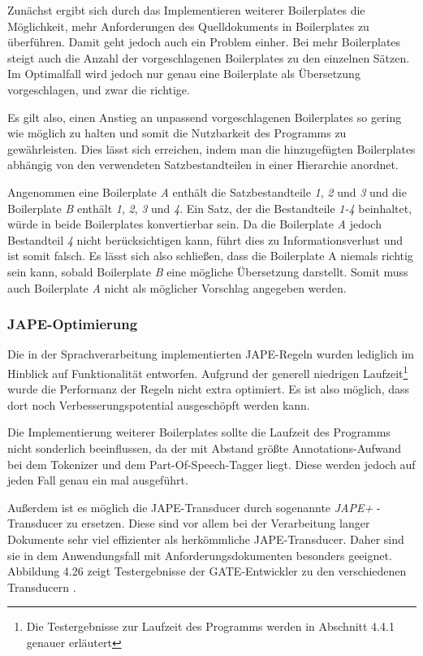 \documentclass[12pt]{report}
\begin{document}
Zunächst ergibt sich durch das Implementieren weiterer Boilerplates die Möglichkeit, mehr Anforderungen des Quelldokuments in Boilerplates zu überführen. Damit geht jedoch auch ein Problem einher. Bei mehr Boilerplates steigt auch die Anzahl der vorgeschlagenen Boilerplates zu den einzelnen Sätzen. Im Optimalfall wird jedoch nur genau eine Boilerplate als Übersetzung vorgeschlagen, und zwar die richtige. 

Es gilt also, einen Anstieg an unpassend vorgeschlagenen Boilerplates so gering wie möglich zu halten und somit die Nutzbarkeit des Programms zu gewährleisten. Dies lässt sich erreichen, indem man die hinzugefügten Boilerplates abhängig von den verwendeten Satzbestandteilen in einer Hierarchie anordnet. 

Angenommen eine Boilerplate \textit{A} enthält die Satzbestandteile \textit{1}, \textit{2} und \textit{3} und die Boilerplate \textit{B} enthält \textit{1}, \textit{2}, \textit{3} und \textit{4}. Ein Satz, der die Bestandteile \textit{1-4} beinhaltet, würde in beide Boilerplates konvertierbar sein. Da die Boilerplate \textit{A} jedoch Bestandteil \textit{4} nicht berücksichtigen kann, führt dies zu Informationsverlust und ist somit falsch. Es lässt sich also schließen, dass die Boilerplate A niemals richtig sein kann, sobald Boilerplate \textit{B} eine  mögliche Übersetzung darstellt. Somit muss auch Boilerplate \textit{A} nicht als möglicher Vorschlag angegeben werden.
 
\subsubsection{JAPE-Optimierung}
Die in der Sprachverarbeitung implementierten JAPE-Regeln wurden lediglich im Hinblick auf Funktionalität entworfen. Aufgrund der generell niedrigen Laufzeit\footnote{Die Testergebnisse zur Laufzeit des Programms werden in Abschnitt 4.4.1 genauer erläutert} wurde die Performanz der Regeln nicht extra optimiert. Es ist also möglich, dass dort noch Verbesserungspotential ausgeschöpft werden kann. 

Die Implementierung weiterer Boilerplates sollte die Laufzeit des Programms nicht sonderlich beeinflussen, da der mit Abstand größte Annotations-Aufwand bei dem Tokenizer und dem Part-Of-Speech-Tagger liegt. Diese werden jedoch auf jeden Fall genau ein mal ausgeführt. 

Außerdem ist es möglich die JAPE-Transducer durch sogenannte \textit{JAPE+} -Transducer zu ersetzen. Diese sind vor allem bei der Verarbeitung langer Dokumente sehr viel effizienter als herkömmliche JAPE-Transducer. Daher sind sie in dem Anwendungsfall mit Anforderungsdokumenten besonders geeignet. Abbildung 4.26 zeigt Testergebnisse der GATE-Entwickler zu den verschiedenen Transducern \cite{gm19}.
\end{document}

